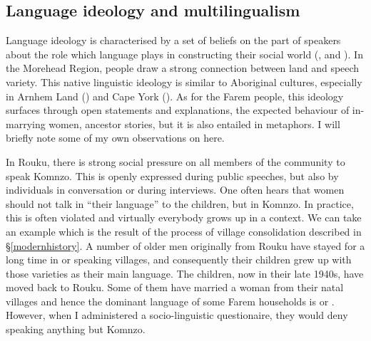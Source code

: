 \subsection{Language ideology and multilingualism}\label{ideomulti}

Language ideology is characterised by a set of beliefs on the part of speakers about the role which language plays in constructing their social world (\citealt{Silverstein:1979li}, \citealt{Rumsey:1990vb} and \citealt{Makihara:2007co}). In the Morehead Region, people draw a strong connection between land and speech variety. This native linguistic ideology is similar to Aboriginal cultures, especially in Arnhem Land (\citealt{Merlan:1981ue}) and Cape York (\citealt{Sutton1978:ws}). As for the Farem people, this ideology surfaces through open statements and explanations, the expected behaviour of in-marrying women, ancestor stories, but it is also entailed in metaphors. I will briefly note some of my own observations on  here.

In Rouku, there is strong social pressure on all members of the community to speak Komnzo. This is openly expressed during public speeches, but also by individuals in conversation or during interviews. One often hears that women should not talk in ``their language'' to the children, but in Komnzo. In practice, this is often violated and virtually everybody grows up in a  context. We can take an example which is the result of the process of village consolidation described in \S\ref{modernhistory}. A number of older men originally from Rouku have stayed for a long time in  or  speaking villages, and consequently their children grew up with those varieties as their main language. The children, now in their late 1940s, have moved back to Rouku. Some of them have married a woman from their natal villages and hence the dominant language of some Farem households is  or . However, when I administered a socio-linguistic questionaire, they would deny speaking anything but Komnzo.

